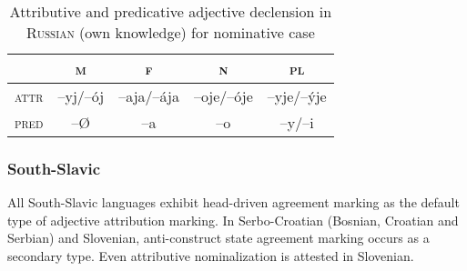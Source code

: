 \begin{table}[h]
\begin{center}
\begin{footnotesize}
\begin{tabular}[t]{l|c c c c}
\hline
\hline
			&\textsc{m}	&\textsc{f}		&\textsc{n}	&\textsc{pl}\\
\hline
\textsc{attr}	&–yj/\-–ój		&–aja/\-–ája	&–oje/\-–óje	&–yje/\-–\'yje\\
\textsc{pred}	&–{Ø}		&–a			&–o			&–y/\-–i\\
			\hline
			\hline
\end{tabular}
\caption[Adjective paradigm for \textsc{Russian}]{Attributive and predicative adjective declension in \textsc{Russian} (own knowledge) for nominative case}
\label{Russian adj agr paradigm}
\end{footnotesize}
\end{center}
\end{table}

\subsubsection{South-Sla\-vic} \label{s-slavic synchr}
All South-Sla\-vic languages exhibit head-driven agreement marking as the default type of adjective attribution marking. In Serbo-Croatian (Bosnian, Croatian and Serbian) and Slovenian, anti-construct state agreement marking occurs as a secondary type. Even attributive nominalization is attested in Slovenian.
 
